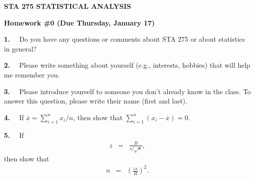 \hoffset=0in
\voffset=0in
\topmargin -1.0in
\headheight 0.0in
\textheight 10.50in 
\footheight 0.0in
\footskip 0.0in
\oddsidemargin -0.0in
\evensidemargin 0.0in 
\textwidth 6.5in



\pagestyle{empty}

\vspace*{0.25in}

\centerline{\bf STA 275 STATISTICAL ANALYSIS} 
\centerline{\bf Homework \#0 (Due Thursday, January 17)} 

\parindent 0pt

\vspace*{0.25in}

{\bf 1.} \ \ Do you have any questions or comments about STA 275 or about statistics in general? \\

\vspace*{0.10in}

{\bf 2.} \ \ Please write something about yourself (e.g., interests, hobbies) that will help me remember you. \\

\vspace*{0.10in}

{\bf 3.} \ \ Please introduce yourself to someone you don't already know in the class.  To answer this question, please write their name (first and last). \\ 

\vspace*{0.10in}

{\bf 4.} \ \ If $\overline{x} = \sum\limits_{i=1}^n x_i/n$, then show that $\sum\limits_{i=1}^n (x_i-\overline{x}) = 0$. \\

\vspace*{0.10in}

{\bf 5.} \ \ If 
\begin{eqnarray*}
z & = & \frac{B}{s/\sqrt{n}},
\end{eqnarray*}
then show that
\begin{eqnarray*}
n & = & { \left( \frac{zs}{B} \right) }^2.
\end{eqnarray*}



